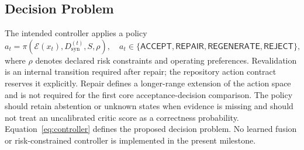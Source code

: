 \subsection{Decision Problem}

The intended controller applies a policy
\begin{equation}
  a_t=\pi\!\left(\mathcal{E}(x_t),
                  D_{\mathrm{syn}}^{(t)},S,\rho\right),
  \quad
  a_t\in\{\mathsf{ACCEPT},\mathsf{REPAIR},
           \mathsf{REGENERATE},\mathsf{REJECT}\},
  \label{eq:controller}
\end{equation}
where $\rho$ denotes declared risk constraints and operating preferences.
Revalidation is an internal transition required after repair; the repository
action contract reserves it explicitly. Repair defines a longer-range
extension of the action space and is not required for the first core
acceptance-decision comparison. The policy should retain abstention or
unknown states when evidence is missing and should not treat an uncalibrated
critic score as a correctness probability. Equation~\eqref{eq:controller}
defines the proposed decision problem. No learned fusion or risk-constrained
controller is implemented in the present milestone.
